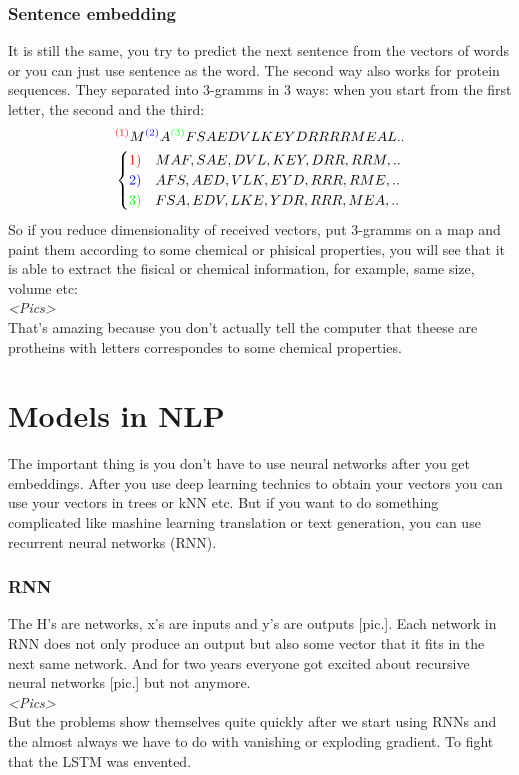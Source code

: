 \subsubsection*{Sentence embedding}

It is still the same, you try to predict the next sentence from the vectors of words or you can just use sentence as the word.
The second way also works for protein sequences. They separated into 3-gramms in 3 ways: when you start from the first letter, the second and the third:
$$^{\color{red}(1)}M^{\color{blue}(2)}A^{\color{green}(3)}FSAEDVLKEYDRRRRMEAL..$$
$$\begin{cases}
	{\color{red} 1)} & MAF,SAE,DVL,KEY,DRR,RRM,..\\
	{\color{blue} 2)} & AFS,AED,VLK,EYD,RRR,RME,..\\
	{\color{green} 3)} & FSA,EDV,LKE,YDR,RRR,MEA,..\\
\end{cases}$$
So if you reduce dimensionality of received vectors, put 3-gramms on a map and paint them according to some chemical or phisical properties, you will see that it is able to extract the fisical or chemical information, for example, same size, volume etc:\\
{\it <Pics>}\\
That's amazing because you don't actually tell the computer that theese are protheins with letters correspondes to some chemical properties.

\section{Models in NLP}

The important thing is you don't have to use neural networks after you get embeddings. After you use deep learning technics to obtain your vectors you can use your vectors in trees or kNN etc. But if you want to do something complicated like mashine learning translation or text generation, you can use recurrent neural networks (RNN).

\subsubsection*{RNN}

The H's are networks, x's are inputs and y's are outputs [pic.]. Each network in RNN does not only produce an output but also some vector that it fits in the next same network. And for two years everyone got excited about recursive neural networks [pic.] but not anymore.\\
{\it <Pics>}\\
But the problems show themselves quite quickly after we start using RNNs and the almost always we have to do with vanishing or exploding gradient. {\it <The intuition why it happens>} To fight that the LSTM was envented.

